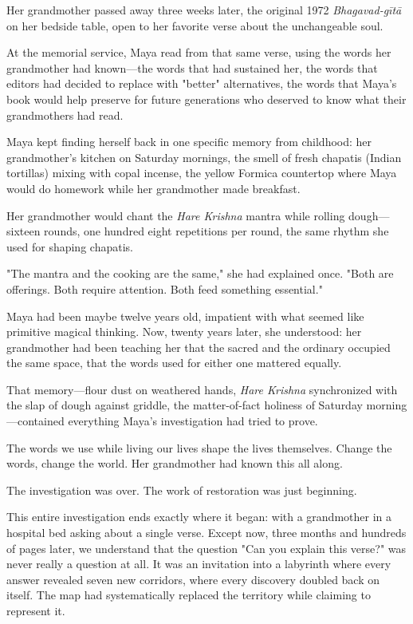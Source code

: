 \documentclass[12pt,twoside]{book}
\begin{document}
Her grandmother passed away three weeks later, the original 1972 \emph{Bhagavad-gītā} on her bedside table, open to her favorite verse about the unchangeable soul.

At the memorial service, Maya read from that same verse, using the words her grandmother had known—the words that had sustained her, the words that editors had decided to replace with "better" alternatives, the words that Maya's book would help preserve for future generations who deserved to know what their grandmothers had read.

Maya kept finding herself back in one specific memory from childhood: her grandmother's kitchen on Saturday mornings, the smell of fresh chapatis (Indian tortillas) mixing with copal incense, the yellow Formica countertop where Maya would do homework while her grandmother made breakfast.

Her grandmother would chant the \emph{Hare Krishna} mantra while rolling dough—sixteen rounds, one hundred eight repetitions per round, the same rhythm she used for shaping chapatis.

"The mantra and the cooking are the same," she had explained once. "Both are offerings. Both require attention. Both feed something essential."

Maya had been maybe twelve years old, impatient with what seemed like primitive magical thinking. Now, twenty years later, she understood: her grandmother had been teaching her that the sacred and the ordinary occupied the same space, that the words used for either one mattered equally.

That memory—flour dust on weathered hands, \emph{Hare Krishna} synchronized with the slap of dough against griddle, the matter-of-fact holiness of Saturday morning—contained everything Maya's investigation had tried to prove.

The words we use while living our lives shape the lives themselves. Change the words, change the world. Her grandmother had known this all along.

The investigation was over. The work of restoration was just beginning.

This entire investigation ends exactly where it began: with a grandmother in a hospital bed asking about a single verse. Except now, three months and hundreds of pages later, we understand that the question "Can you explain this verse?" was never really a question at all. It was an invitation into a labyrinth where every answer revealed seven new corridors, where every discovery doubled back on itself. The map had systematically replaced the territory while claiming to represent it.
\end{document}

